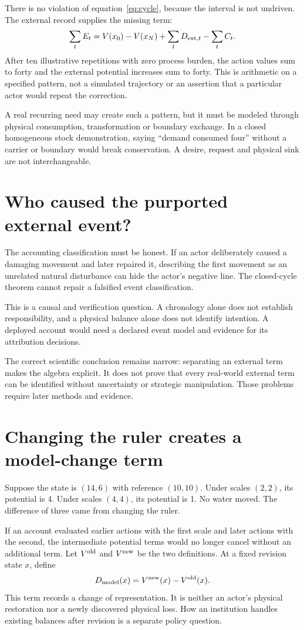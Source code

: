 There is no violation of equation~\eqref{eq:cycle}, because the interval is not undriven. The external record supplies the missing term:
\[
 \sum_tE_t=V(x_0)-V(x_N)+\sum_tD_{{\rm ext},t}-\sum_tC_t.
\]
After ten illustrative repetitions with zero process burden, the action values sum to forty and the external potential increases sum to forty. This is arithmetic on a specified pattern, not a simulated trajectory or an assertion that a particular actor would repeat the correction.

A real recurring need may create such a pattern, but it must be modeled through physical consumption, transformation or boundary exchange. In a closed homogeneous stock demonstration, saying ``demand consumed four'' without a carrier or boundary would break conservation. A desire, request and physical sink are not interchangeable.

\section{Who caused the purported external event?}
The accounting classification must be honest. If an actor deliberately caused a damaging movement and later repaired it, describing the first movement as an unrelated natural disturbance can hide the actor's negative line. The closed-cycle theorem cannot repair a falsified event classification.

This is a causal and verification question. A chronology alone does not establish responsibility, and a physical balance alone does not identify intention. A deployed account would need a declared event model and evidence for its attribution decisions.

The correct scientific conclusion remains narrow: separating an external term makes the algebra explicit. It does not prove that every real-world external term can be identified without uncertainty or strategic manipulation. Those problems require later methods and evidence.

\section{Changing the ruler creates a model-change term}
Suppose the state is $(14,6)$ with reference $(10,10)$. Under scales $(2,2)$, its potential is 4. Under scales $(4,4)$, its potential is 1. No water moved. The difference of three came from changing the ruler.

If an account evaluated earlier actions with the first scale and later actions with the second, the intermediate potential terms would no longer cancel without an additional term. Let $V^{\rm old}$ and $V^{\rm new}$ be the two definitions. At a fixed revision state $x$, define
\begin{equation}
 D_{\rm model}(x)=V^{\rm new}(x)-V^{\rm old}(x).
\end{equation}
This term records a change of representation. It is neither an actor's physical restoration nor a newly discovered physical loss. How an institution handles existing balances after revision is a separate policy question.

